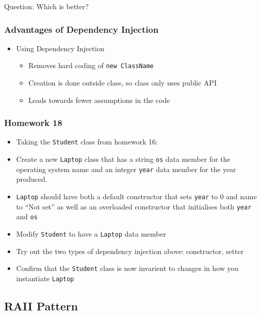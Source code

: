 Question: Which is better?

\subsubsection{Advantages of Dependency
Injection}\label{advantages-of-dependency-injection}

\begin{itemize}
\itemsep1pt\parskip0pt
\item
  Using Dependency Injection

  \begin{itemize}
  \itemsep1pt\parskip0pt
  \item
    Removes hard coding of \texttt{new ClassName}
  \item
    Creation is done outside class, so class only uses public API
  \item
    Leads towards fewer assumptions in the code
  \end{itemize}
\end{itemize}

\subsubsection{Homework 18}\label{homework-18}

\begin{itemize}
\itemsep1pt\parskip0pt
\item
  Taking the \texttt{Student} class from homework 16:
\item
  Create a new \texttt{Laptop} class that has a string \texttt{os} data
  member for the operating system name and an integer \texttt{year} data
  member for the year produced.
\item
  \texttt{Laptop} should have both a default constructor that sets
  \texttt{year} to 0 and name to ``Not set'' as well as an overloaded
  constructor that initialises both \texttt{year} and \texttt{os}
\item
  Modify \texttt{Student} to have a \texttt{Laptop} data member
\item
  Try out the two types of dependency injection above: constructor,
  setter
\item
  Confirm that the \texttt{Student} class is now invarient to changes in
  how you instantiate \texttt{Laptop}
\end{itemize}

\subsection{RAII Pattern}\label{raii-pattern}

